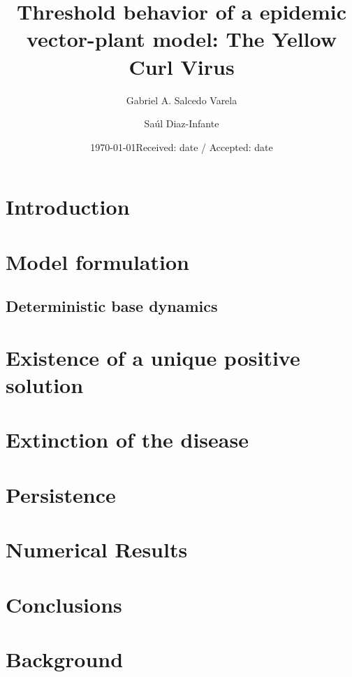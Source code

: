 \documentclass[smallextended]{svjour3}
\begin{document}
	\title{Threshold behavior of a epidemic vector-plant model: The Yellow Curl Virus}
	\author{Gabriel A. Salcedo Varela  \and Saúl Diaz-Infante }
	\date{\today}

\date{Received: date / Accepted: date}

	\maketitle
	\begin{abstract}
	\end{abstract}
	\section{Introduction}
	\section{Model formulation}
		\subsection{Deterministic base dynamics}
		
	\section{Existence of a unique positive solution}
		
	\section{Extinction of the disease}
		
		
	\section{Persistence}
	
	\section{Numerical Results}
	\section{Conclusions}
	
	\appendix
	\section{Background}
\end{document}
